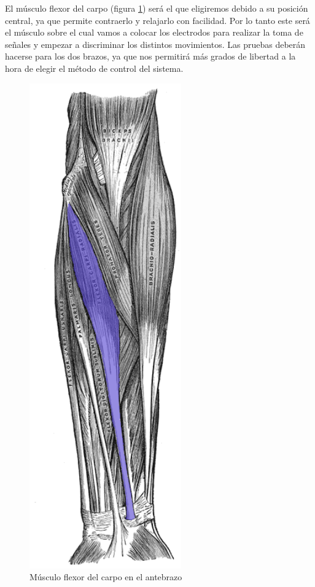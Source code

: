 El músculo flexor del carpo (figura \ref{fig:flexor}) será  el que eligiremos debido a su posición central, ya que permite contraerlo y relajarlo con facilidad. \newline Por lo tanto este será el músculo sobre el cual vamos a colocar los electrodos para realizar la toma de señales y empezar a discriminar los distintos movimientos. Las pruebas deberán hacerse para los dos brazos, ya que nos permitirá más grados de libertad a la hora de elegir el método de control del sistema.  

\begin{figure}[H]
	\center
	\includegraphics[scale=0.5]{imagenes/Disenodelsistema/flexor.png}
	\caption{Músculo flexor del carpo en el antebrazo}
	\label{fig:flexor}
\end{figure}


